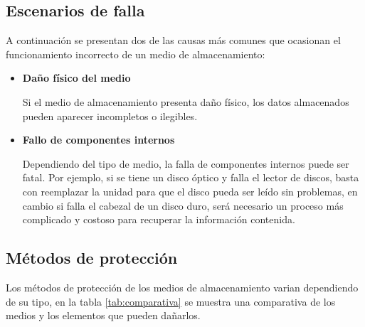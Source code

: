   \subsection {Escenarios de falla}

A continuaci\'{o}n se presentan dos de las causas m\'{a}s comunes que ocasionan el funcionamiento incorrecto de un medio de almacenamiento:

    \begin{itemize}

      \item \textbf{Da\~{n}o f\'{i}sico del medio}

Si el medio de almacenamiento presenta da\~{n}o f\'{i}sico, los datos almacenados pueden aparecer incompletos o ilegibles.

      \item \textbf{Fallo de componentes internos}

Dependiendo del tipo de medio, la falla de componentes internos puede ser fatal. Por ejemplo, si se tiene un disco \'{o}ptico y falla el lector de discos, basta con reemplazar la unidad para que el disco pueda ser le\'{i}do sin problemas, en cambio si falla el cabezal de un disco duro, ser\'{a} necesario un proceso m\'{a}s complicado y costoso para recuperar la informaci\'{o}n contenida.

    \end{itemize}

  \subsection {M\'{e}todos de protecci\'{o}n}

Los m\'{e}todos de protecci\'{o}n de los medios de almacenamiento varian dependiendo de su tipo, en la tabla \ref{tab:comparativa} se muestra una comparativa de los medios y los elementos que pueden da\~{n}arlos.

